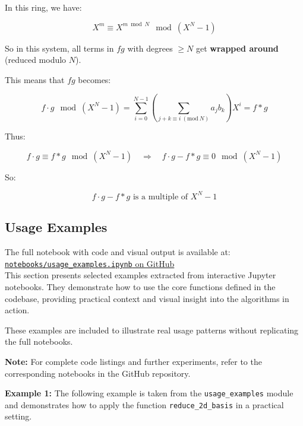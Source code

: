 \documentclass[a4paper,12pt]{article}
\begin{document}
In this ring, we have:

\[
X^m \equiv X^{m \bmod N} \mod (X^N - 1)
\]

So in this system, all terms in \(fg\) with degrees \(\geq N\) get
\textbf{wrapped around} (reduced modulo \(N\)).

This means that \(fg\) becomes:

\[
f \cdot g \mod (X^N - 1) = \sum_{i=0}^{N-1} \left( \sum_{j + k \equiv i \ (\mathrm{mod}\ N)} a_j b_k \right) X^i = f * g
\]

Thus:

\[
f \cdot g \equiv f * g \mod (X^N - 1)
\quad \Rightarrow \quad
f \cdot g - f * g \equiv 0 \mod (X^N - 1)
\]

So:

\[
f \cdot g - f * g \text{ is a multiple of } X^N - 1
\]


\newpage







\subsection{Usage Examples}
\noindent
The full notebook with code and visual output is available at:\\
\href{https://github.com/SanyaKor/Cryptanalysis/blob/main/notebooks/usage_examples.ipynb}{\texttt{notebooks/usage\_examples.ipynb} on GitHub}
\\

This section presents selected examples extracted from interactive Jupyter notebooks.  
They demonstrate how to use the core functions defined in the codebase,  
providing practical context and visual insight into the algorithms in action.

These examples are included to illustrate real usage patterns without replicating the full notebooks.  

\vspace{1em}
\noindent
\textbf{Note:} For complete code listings and further experiments, refer to the corresponding notebooks in the GitHub repository.


\noindent
\textbf{Example 1:}  
The following example is taken from the
\texttt{usage\_examples} module  
and demonstrates how to apply the function
\texttt{reduce\_2d\_basis} in a practical setting.
\end{document}
